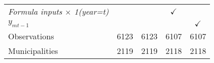 \begin{tabular}{lcccc}
\textit{Formula inputs $\times$ 1(year=t)} 		& 				&   
																& 
												$\checkmark$	& 
												\\

\textit{$y_{mt-1}$}  				& 				&   
												& 
												& 
								$\checkmark$	\\



\midrule		


Observations 			&	 6123   &   
							 6123   & 
							 6107   & 
							 6107   \\

Municipalities  		&    2119   &   
							 2119   & 
							 2118   & 
							 2118   \\

\bottomrule

\end{tabular}%
